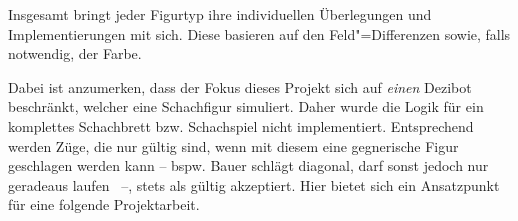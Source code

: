 
Insgesamt bringt jeder Figurtyp ihre individuellen Überlegungen und Implementierungen mit sich. Diese basieren auf den Feld"=Differenzen sowie, falls notwendig, der Farbe.


Dabei ist anzumerken, dass der Fokus dieses Projekt sich auf \emph{einen} Dezibot beschränkt, welcher eine Schachfigur simuliert. Daher wurde die Logik für ein komplettes Schachbrett bzw. Schachspiel nicht implementiert. Entsprechend werden Züge, die nur gültig sind, wenn mit diesem eine gegnerische Figur geschlagen werden kann -- bspw. Bauer schlägt diagonal, darf sonst jedoch nur geradeaus laufen~\cite{justUSChessFederations2019} --, stets als gültig akzeptiert. Hier bietet sich ein Ansatzpunkt für eine folgende Projektarbeit.
